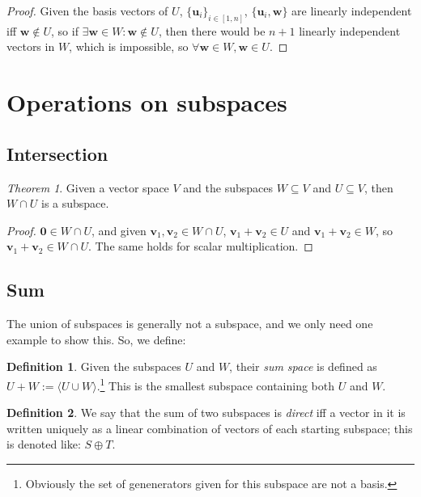\documentclass[12pt,a4paper]{report}
\numberwithin{equation}{section}
\theoremstyle{definition}
\newtheorem{definition}{Definition}[section]
\theoremstyle{remark}
\newtheorem{theorem}{Theorem}[section]
\begin{document}
\begin{proof}
Given the basis vectors of $U$, $\lbrace \mathbf{u}_i\rbrace _{i\in [1, n]}$, $\lbrace \mathbf{u}_i, \mathbf{w}\rbrace$ are linearly independent iff $\mathbf{w} \notin U$, so if $\exists \mathbf{w} \in W: \mathbf{w}\notin U$, then there would be $n+1$ linearly independent vectors in $W$, which is impossible, so $\forall\mathbf{w} \in W, \mathbf{w} \in U$.
\end{proof}

\section{Operations on subspaces}

\subsection{Intersection}

\begin{theorem}
Given a vector space $V$ and the subspaces $W \subseteq V$ and $U\subseteq V$, then $W\cap U$ is a subspace.
\end{theorem}
\begin{proof}
$\mathbf{0} \in W\cap U$, and given $\mathbf{v}_1, \mathbf{v}_2 \in W\cap U$, $\mathbf{v}_1 + \mathbf{v}_2 \in U$ and $\mathbf{v}_1 + \mathbf{v}_2 \in W$, so $\mathbf{v}_1 + \mathbf{v}_2 \in W\cap U$. The same holds for scalar multiplication.
\end{proof}

\subsection{Sum}

The union of subspaces is generally not a subspace, and we only need one example to show this. So, we define:

\begin{definition}
Given the subspaces $U$ and $W$, their \emph{sum space} is defined as $U+W := \langle U \cup W \rangle$.\footnote{Obviously the set of genenerators given for this subspace are not a basis.} This is the smallest subspace containing both $U $ and $W$.
\end{definition}

\begin{definition}
We say that the sum of two subspaces is \emph{direct} iff a vector in it is written uniquely as a linear combination of vectors of each starting subspace; this is denoted like: $S \oplus T$.
\end{definition}
\end{document}
